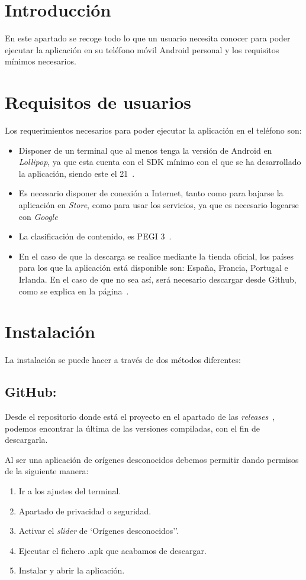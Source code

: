 
\section{Introducción}\label{manualusuario}
En este apartado se recoge todo lo que un usuario necesita conocer para poder ejecutar la aplicación en su teléfono móvil Android personal y los requisitos mínimos necesarios.

\section{Requisitos de usuarios}
Los requerimientos necesarios para poder ejecutar la aplicación en el teléfono son:
\begin{itemize}
	\tightlist
	\item
	Disponer de un terminal que al menos tenga la versión de Android en \emph{Lollipop}, ya que esta cuenta con el SDK mínimo con el que se ha desarrollado la aplicación, siendo este el 21~\cite{wiki:versionAndroid}.
	\item
	Es necesario disponer de conexión a Internet, tanto como para bajarse la aplicación en \emph{Store}, como para usar los servicios, ya que es necesario logearse con \emph{Google}
	\item La clasificación de contenido, es PEGI 3~\cite{wiki:pegi}. 
	\item En el caso de que la descarga se realice mediante la tienda oficial, los países para los que la aplicación está disponible son: España, Francia, Portugal e Irlanda. En el caso de que no sea así, será necesario descargar desde Github, como se explica en la página~\pageref{descargaGit}.
\end{itemize}

\section{Instalación}
La instalación se puede hacer a través de dos métodos diferentes:

\subsection{GitHub:}\label{descargaGit}
Desde el repositorio donde está el proyecto en el apartado de las \emph{releases}~\cite{github:releases}, podemos encontrar la última de las versiones compiladas, con el fin de descargarla.

Al ser una aplicación de orígenes desconocidos debemos permitir dando permisos de la siguiente manera:
\begin{enumerate}
	\tightlist
	\item Ir a los ajustes del terminal.
	\item Apartado de privacidad o seguridad.
	\item Activar el \emph{slider} de `Orígenes desconocidos''.
	\item Ejecutar el fichero .apk que acabamos de descargar.
	\item Instalar y abrir la aplicación.
\end{enumerate}

